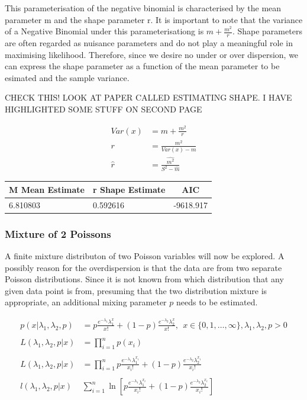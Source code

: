 \documentclass[11pt,preprint, authoryear]{elsarticle}
\numberwithin{equation}{section}
\numberwithin{figure}{section}
\numberwithin{table}{section}
\begin{document}
This parameterisation of the negative binomial is characterised by the
mean parameter m and the shape parameter r. It is important to note that
the variance of a Negative Binomial under this parameterisationg is
\(m + \frac{m^2}{r}\). Shape parameters are often regarded as nuisance
parameters and do not play a meaningful role in maximising likelihood.
Therefore, since we desire no under or over dispersion, we can express
the shape parameter as a function of the mean parameter to be esimated
and the sample variance.

CHECK THIS! LOOK AT PAPER CALLED ESTIMATING SHAPE. I HAVE HIGHLIGHTED
SOME STUFF ON SECOND PAGE

\begin{align*}
Var(x) &= m + \frac{m^2}{r} \\
r &= \frac{m^2}{Var(x) - m} \\
\hat{r} &= \frac{\hat{m^2}}{S^2 - \hat{m}}
\end{align*}

\begin{longtable}[]{@{}llc@{}}
\toprule
M Mean Estimate & r Shape Estimate & AIC\tabularnewline
\midrule
\endhead
6.810803 & 0.592616 & -9618.917\tabularnewline
\bottomrule
\end{longtable}

\subsubsection{Mixture of 2 Poissons}\label{mixture-of-2-poissons}

A finite mixture distributon of two Poisson variables will now be
explored. A possibly reason for the overdispersion is that the data are
from two separate Poisson distributions. Since it is not known from
which distribution that any given data point is from, presuming that the
two distribution mixture is appropriate, an additional mixing parameter
\(p\) needs to be estimated.

\begin{align*} 
p(x|\lambda_1,\lambda_2,p) & =  p\frac{e^{-\lambda_1} \lambda_1^x}{x!} + (1-p)\frac{e^{-\lambda_2} \lambda_2^x}{x!},\ \ x\in \{0,1,\ldots,\infty\},\lambda_1 , \lambda_2 , p >0 \\
\\
L(\lambda_1,\lambda_2,p|x) & = \prod_{i=1}^n p(x_i) \\
\\
L(\lambda_1,\lambda_2,p|x) & =  \prod_{i=1}^n p\frac{e^{-\lambda_1} \lambda_1^{x_i}}{x_i!} + (1-p)\frac{e^{-\lambda_2} \lambda_2^{x_i}}{x_i!} \\
\\
l(\lambda_1,\lambda_2,p|x) & \sum^n_{i=1} \ln [ p\frac{e^{-\lambda_1} \lambda_1^{x_i}}{x_i!} + (1-p)\frac{e^{-\lambda_2} \lambda_2^{x_i}}{x_i!} ]
\end{align*}
\end{document}
